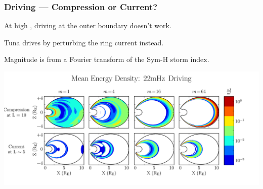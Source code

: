 \documentclass{beamer}
\begin{document}
\begin{frame}
\frametitle{Driving --- Compression or Current?}

\begin{wideitemize}
\item At high \azm, driving at the outer boundary doesn't work. 
\item Tuna drives by perturbing the ring current instead. 
\item Magnitude is from a Fourier transform of the Sym-H storm index. 
\end{wideitemize}

\vfill

\includegraphics[width=\textwidth]{figures/drivers.pdf}%

\end{frame}

\end{document}
